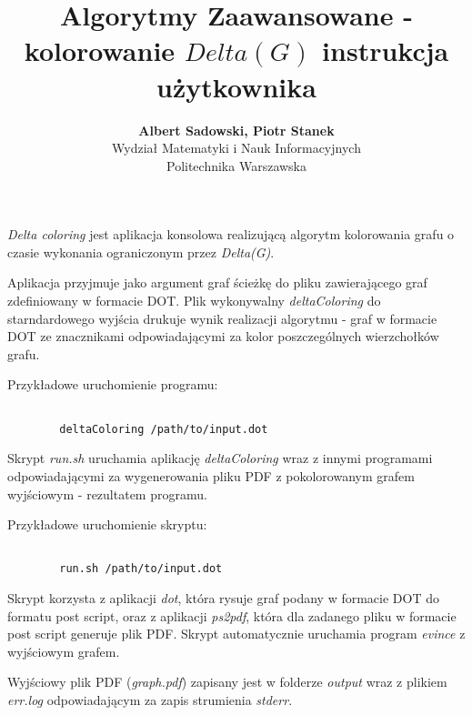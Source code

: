 \documentclass[a4paper]{article}
\title{\textbf{Algorytmy Zaawansowane - kolorowanie $Delta(G)$ instrukcja użytkownika}}
\author{\textbf{Albert Sadowski, Piotr Stanek}\\
	Wydział Matematyki i Nauk Informacyjnych\\
	Politechnika Warszawska}
\begin{document}
	\maketitle

	{\em Delta coloring} jest aplikacja konsolowa realizującą algorytm kolorowania grafu o czasie wykonania ograniczonym przez {\em Delta(G)}.

	Aplikacja przyjmuje jako argument graf ścieżkę do pliku zawierającego graf zdefiniowany w formacie DOT. Plik wykonywalny {\em deltaColoring} do starndardowego wyjścia drukuje wynik realizacji algorytmu - graf w formacie DOT ze znacznikami odpowiadającymi za kolor poszczególnych wierzchołków grafu.

	Przykładowe uruchomienie programu:

	\begin{verbatim}

		deltaColoring /path/to/input.dot

	\end{verbatim}

	Skrypt {\em run.sh} uruchamia aplikację {\em deltaColoring} wraz z innymi programami odpowiadającymi za wygenerowania pliku PDF z pokolorowanym grafem wyjściowym - rezultatem programu. 

	Przykładowe uruchomienie skryptu:

	\begin{verbatim}

		run.sh /path/to/input.dot

	\end{verbatim}


	Skrypt korzysta z aplikacji {\em dot}, która rysuje graf podany w formacie DOT do formatu post script, oraz z aplikacji {\em ps2pdf}, która dla zadanego pliku w formacie post script generuje plik PDF. Skrypt automatycznie uruchamia program {\em evince} z wyjściowym grafem.

	Wyjściowy plik PDF ({\em graph.pdf}) zapisany jest w folderze {\em output} wraz z plikiem {\em err.log} odpowiadającym za zapis strumienia {\em stderr}.
\end{document}
